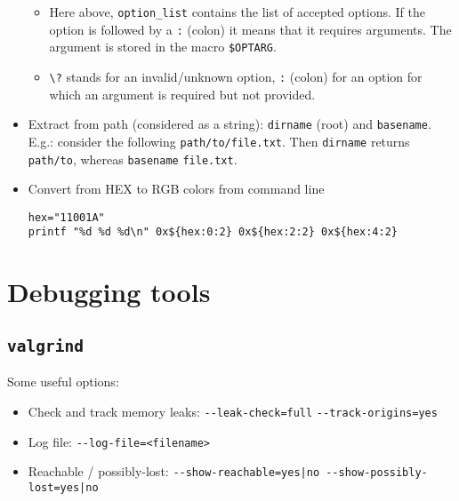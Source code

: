 \documentclass[a4paper,12pt,%
              final%
              ]{article}
\begin{document}
\begin{itemize}
\begin{itemize}
      \item Here above, \verb|option_list| contains the list of accepted options. If the option is followed by a \verb|:| (colon) it means that it requires arguments. The argument is stored in the macro \verb|$OPTARG|.
      \item \verb|\?| stands for an invalid/unknown option, \verb|:| (colon) for an option for which an argument is required but not provided.
    \end{itemize}
  \item Extract from path (considered as a string): \texttt{dirname} (root) and \texttt{basename}. E.g.: consider the following \texttt{path/to/file.txt}. Then \texttt{dirname} returns \texttt{path/to}, whereas \texttt{basename} \texttt{file.txt}.
  \item Convert from HEX to RGB colors from command line
\begin{verbatim}
hex="11001A"
printf "%d %d %d\n" 0x${hex:0:2} 0x${hex:2:2} 0x${hex:4:2}
\end{verbatim}
\end{itemize}

\section{Debugging tools}
\subsection{\texttt{valgrind}}
Some useful options:
\begin{itemize}
  \item Check and track memory leaks: \verb|--leak-check=full| \verb|--track-origins=yes|
  \item Log file: \verb|--log-file=<filename>|
  \item Reachable / possibly-lost: \verb!--show-reachable=yes|no --show-possibly-lost=yes|no!
\end{itemize}

\end{document}
